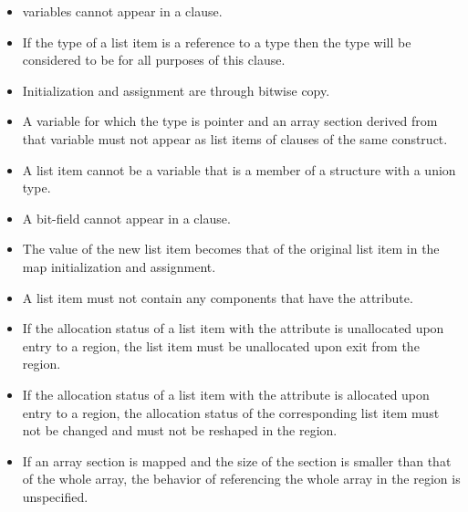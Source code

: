 {{{{\begin{itemize}
\item {} variables cannot appear in a  clause.

\cppspecificstart
\item If the type of a list item is a reference to a type  then the type will be considered to be  for all purposes of this clause.
\cppspecificend

\ccppspecificstart
\item Initialization and assignment are through bitwise copy.

\item A variable for which the type is pointer and an array section derived from that variable must not appear as list items of  clauses of the same construct. 

\item A list item cannot be a variable that is a member of a structure with a union type.

\item A bit-field cannot appear in a  clause.
\ccppspecificend
\end{itemize}

\begin{samepage}
\fortranspecificstart
\begin{itemize}
\item The value of the new list item becomes that of the original list item in the map 
initialization and assignment.

\item A list item must not contain any components that have the
   attribute.

\item If the allocation status of a list item with the
   attribute is unallocated upon entry to a
   region, the list item must be unallocated
  upon exit from the region.

\item If the allocation status of a list item with the
   attribute is allocated upon entry to a
   region, the allocation status of the corresponding
  list item must not be changed and must not be reshaped in the
  region.

\item If an array section is mapped and the size of the section is
  smaller than that of the whole array, the behavior of referencing
  the whole array in the  region is unspecified.


\end{itemize}
\end{samepage}}}}}
